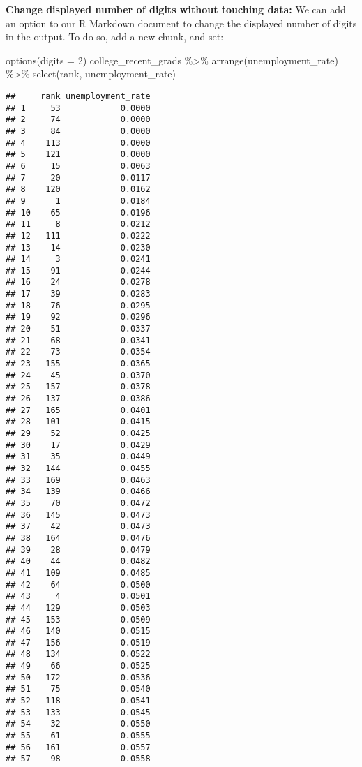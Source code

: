 \documentclass[
]{article}
\newenvironment{Shaded}{\begin{snugshade}}{\end{snugshade}}
\newcommand{\AttributeTok}[1]{\textcolor[rgb]{0.77,0.63,0.00}{#1}}
\newcommand{\DecValTok}[1]{\textcolor[rgb]{0.00,0.00,0.81}{#1}}
\newcommand{\FunctionTok}[1]{\textcolor[rgb]{0.00,0.00,0.00}{#1}}
\newcommand{\NormalTok}[1]{#1}
\newcommand{\SpecialCharTok}[1]{\textcolor[rgb]{0.00,0.00,0.00}{#1}}
\begin{document}
\textbf{Change displayed number of digits without touching data:} We can
add an option to our R Markdown document to change the displayed number
of digits in the output. To do so, add a new chunk, and set:

\begin{Shaded}
\begin{Highlighting}[]
\FunctionTok{options}\NormalTok{(}\AttributeTok{digits =} \DecValTok{2}\NormalTok{)}
\NormalTok{college\_recent\_grads }\SpecialCharTok{\%\textgreater{}\%}
  \FunctionTok{arrange}\NormalTok{(unemployment\_rate) }\SpecialCharTok{\%\textgreater{}\%}
  \FunctionTok{select}\NormalTok{(rank, unemployment\_rate)}
\end{Highlighting}
\end{Shaded}

\begin{verbatim}
##     rank unemployment_rate
## 1     53            0.0000
## 2     74            0.0000
## 3     84            0.0000
## 4    113            0.0000
## 5    121            0.0000
## 6     15            0.0063
## 7     20            0.0117
## 8    120            0.0162
## 9      1            0.0184
## 10    65            0.0196
## 11     8            0.0212
## 12   111            0.0222
## 13    14            0.0230
## 14     3            0.0241
## 15    91            0.0244
## 16    24            0.0278
## 17    39            0.0283
## 18    76            0.0295
## 19    92            0.0296
## 20    51            0.0337
## 21    68            0.0341
## 22    73            0.0354
## 23   155            0.0365
## 24    45            0.0370
## 25   157            0.0378
## 26   137            0.0386
## 27   165            0.0401
## 28   101            0.0415
## 29    52            0.0425
## 30    17            0.0429
## 31    35            0.0449
## 32   144            0.0455
## 33   169            0.0463
## 34   139            0.0466
## 35    70            0.0472
## 36   145            0.0473
## 37    42            0.0473
## 38   164            0.0476
## 39    28            0.0479
## 40    44            0.0482
## 41   109            0.0485
## 42    64            0.0500
## 43     4            0.0501
## 44   129            0.0503
## 45   153            0.0509
## 46   140            0.0515
## 47   156            0.0519
## 48   134            0.0522
## 49    66            0.0525
## 50   172            0.0536
## 51    75            0.0540
## 52   118            0.0541
## 53   133            0.0545
## 54    32            0.0550
## 55    61            0.0555
## 56   161            0.0557
## 57    98            0.0558

\end{verbatim}
\end{document}
